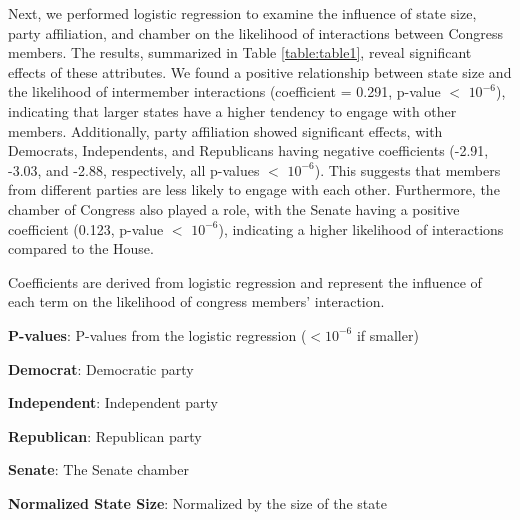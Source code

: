 \documentclass[11pt]{article}
\begin{document}
Next, we performed logistic regression to examine the influence of state size, party affiliation, and chamber on the likelihood of interactions between Congress members. The results, summarized in Table \ref{table:table1}, reveal significant effects of these attributes. We found a positive relationship between state size and the likelihood of intermember interactions (coefficient = 0.291, p-value $<$ $10^{-6}$), indicating that larger states have a higher tendency to engage with other members. Additionally, party affiliation showed significant effects, with Democrats, Independents, and Republicans having negative coefficients (-2.91, -3.03, and -2.88, respectively, all p-values $<$ $10^{-6}$). This suggests that members from different parties are less likely to engage with each other. Furthermore, the chamber of Congress also played a role, with the Senate having a positive coefficient (0.123, p-value $<$ $10^{-6}$), indicating a higher likelihood of interactions compared to the House.

\begin{table}[h]
\caption{Logistic regression results for the influence of state size, party, and chamber on interactions.}
\label{table:table1}
\begin{threeparttable}
\renewcommand{\TPTminimum}{\linewidth}
\begin{tablenotes}
\footnotesize
\item Coefficients are derived from logistic regression and represent the influence of each term on the likelihood of congress members' interaction.
\item \textbf{P-values}: P-values from the logistic regression ($<$$10^{-6}$ if smaller)
\item \textbf{Democrat}: Democratic party
\item \textbf{Independent}: Independent party
\item \textbf{Republican}: Republican party
\item \textbf{Senate}: The Senate chamber
\item \textbf{Normalized State Size}: Normalized by the size of the state
\end{tablenotes}
\end{threeparttable}
\end{table}
\end{document}
